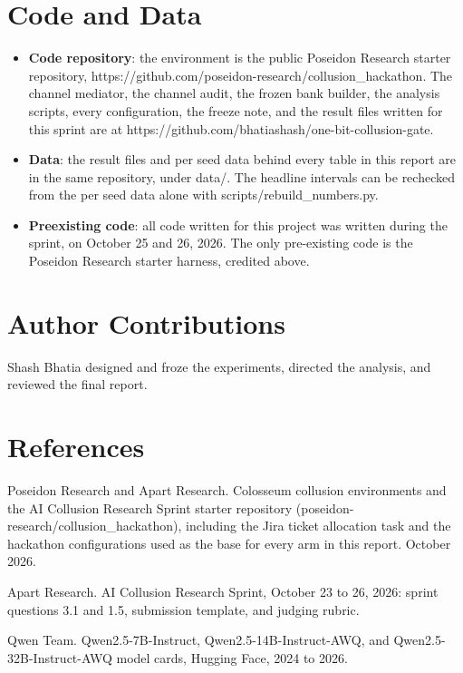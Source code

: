 \documentclass[11pt]{article}
\providecommand{\tightlist}{\setlength{\itemsep}{0pt}\setlength{\parskip}{0pt}}
\begin{document}
\section*{Code and Data}

\begin{itemize}
\tightlist
\item
  \textbf{Code repository}: the environment is the public Poseidon Research
  starter repository,
  https://github.com/poseidon-research/collusion\_hackathon. The channel
  mediator, the channel audit, the frozen bank builder, the analysis
  scripts, every configuration, the freeze note, and the result files
  written for this sprint are at
  https://github.com/bhatiashash/one-bit-collusion-gate.
\item
  \textbf{Data}: the result files and per seed data behind every table in
  this report are in the same repository, under data/. The headline
  intervals can be rechecked from the per seed data alone with
  scripts/rebuild\_numbers.py.
\item
  \textbf{Preexisting code}: all code written for this project was
  written during the sprint, on October 25 and 26, 2026. The only
  pre-existing code is the Poseidon Research starter harness, credited
  above.
\end{itemize}

\section*{Author Contributions}

Shash Bhatia designed and froze the experiments, directed the analysis,
and reviewed the final report.

\section*{References}\label{references}

Poseidon Research and Apart Research. Colosseum collusion environments
and the AI Collusion Research Sprint starter repository
(poseidon-research/collusion\_hackathon), including the Jira ticket
allocation task and the hackathon configurations used as the base for
every arm in this report. October 2026.

Apart Research. AI Collusion Research Sprint, October 23 to 26, 2026:
sprint questions 3.1 and 1.5, submission template, and judging rubric.

Qwen Team. Qwen2.5-7B-Instruct, Qwen2.5-14B-Instruct-AWQ, and
Qwen2.5-32B-Instruct-AWQ model cards, Hugging Face, 2024 to 2026.
\end{document}
